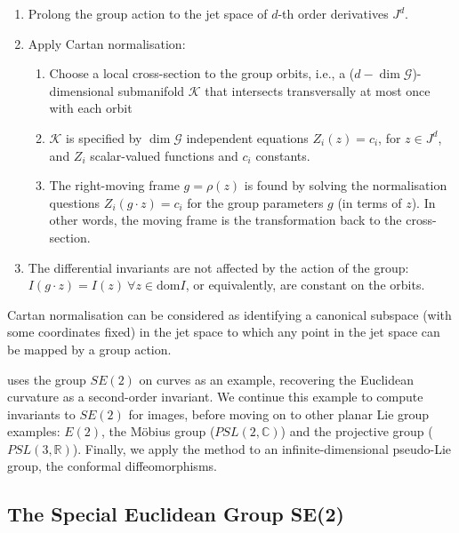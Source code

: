 \documentclass[review,onefignum,onetabnum]{siamonline190516}
\begin{document}
\begin{enumerate}
\item Prolong the group action to the jet space of $d$-th order derivatives $J^d$.
\item Apply Cartan normalisation:
    \begin{enumerate}
    \item Choose a local cross-section to the group orbits, i.e., a ($d - \dim \mathcal{G}$)-dimensional submanifold $\mathcal{K}$ that intersects transversally at most once with each orbit
    \item $\mathcal{K}$ is specified by $\dim \mathcal{G}$ independent equations $Z_i (z) = c_i$, for $z \in J^d$,  and $Z_i$ scalar-valued functions and $c_i$ constants.
    \item The right-moving frame $g = \rho(z)$ is found by solving the normalisation questions $Z_i (g \cdot z) = c_i$ for the group parameters $g$ (in terms of $z$). In other words, the moving frame is the transformation back to the cross-section.
    \end{enumerate}
\item The differential invariants are not affected by the action of the group: $I(g \cdot z) = I(z) \: \forall z \in \mathrm{dom} I$, or equivalently, are constant on the orbits. 
\end{enumerate}

Cartan normalisation can be considered as identifying a canonical subspace (with some coordinates fixed) in the jet space to which any point in the jet space can be mapped by a group action.

\citet{OlverCIT} uses the group $SE(2)$ on curves as an example, recovering the Euclidean curvature as a second-order invariant. We continue this example to compute invariants to $SE(2)$ for images, before moving on to other planar Lie group examples: $E(2)$, the M\"obius group ($PSL(2,\mathbb{C})$) and the projective group ($PSL(3,\mathbb{R})$). Finally, we apply the method to an infinite-dimensional pseudo-Lie group, the conformal diffeomorphisms.

\subsection{The Special Euclidean Group SE(2)}
\label{sec:SE2}
\end{document}
